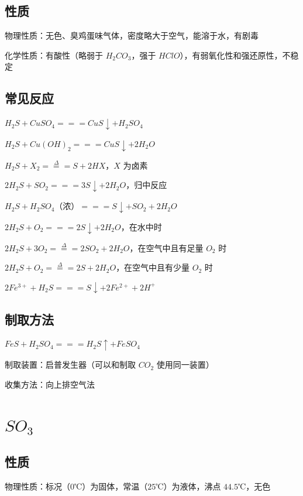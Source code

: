 \documentclass[UTF8,zihao=-4,openany]{ctexbook}
\begin{document}
\subsection{性质}
物理性质：无色、臭鸡蛋味气体，密度略大于空气，能溶于水，有剧毒\par

化学性质：有酸性（略弱于 $H_2CO_3$，强于 $HClO$），有弱氧化性和强还原性，不稳定\par
\subsection{常见反应}
$H_2S+CuSO_4=\!=\!=CuS\downarrow+H_2SO_4$\par

$H_2S+Cu(OH)_2=\!=\!=CuS\downarrow+2H_2O$\par

$H_2S+X_2\stackrel{\Delta}{=\!=\!=}S+2HX$，$X$ 为卤素\par

$2H_2S+SO_2=\!=\!=3S\downarrow+2H_2O$，归中反应\par

$H_2S+H_2SO_4$（浓）$=\!=\!=S\downarrow+SO_2+2H_2O$\par

$2H_2S+O_2=\!=\!=2S\downarrow+2H_2O$，在水中时\par

$2H_2S+3O_2\stackrel{\Delta}{=\!=\!=}2SO_2+2H_2O$，在空气中且有足量 $O_2$ 时\par

$2H_2S+O_2\stackrel{\Delta}{=\!=\!=}2S+2H_2O$，在空气中且有少量 $O_2$ 时\par

$2Fe^{3+}+H_2S=\!=\!=S\downarrow+2Fe^{2+}+2H^+$\par
\subsection{制取方法}
$FeS+H_2SO_4=\!=\!=H_2S\uparrow+FeSO_4$\par

制取装置：启普发生器（可以和制取 $CO_2$ 使用同一装置）\par

收集方法：向上排空气法\par
\section{$SO_3$}
\subsection{性质}
物理性质：标况（$0$℃）为固体，常温（$25$℃）为液体，沸点 $44.5$℃，无色\par
\end{document}
